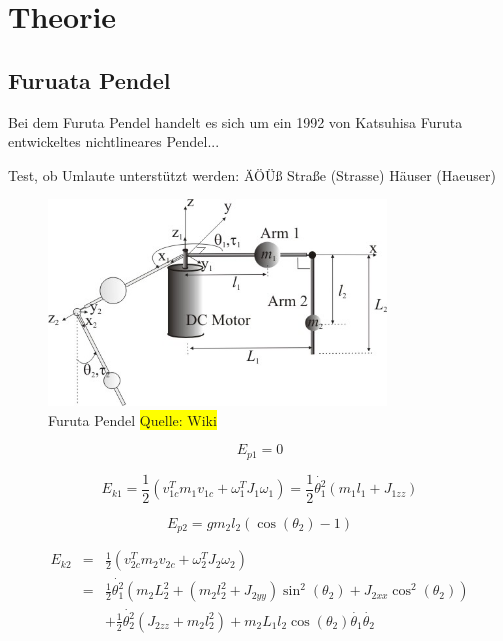\section{Theorie}

\subsection{Furuata Pendel}
Bei dem Furuta Pendel handelt es sich um ein 1992 von Katsuhisa Furuta entwickeltes nichtlineares Pendel...

Test, ob Umlaute unterstützt werden: ÄÖÜß
Straße (Strasse)
Häuser (Haeuser)

\begin{figure}[htbp]
\includegraphics[width=0.8\textwidth]{Grafiken/furuta.jpg}
\caption{Furuta Pendel \colorbox{yellow}{Quelle: Wiki}}
\end{figure}


\begin{equation}
 E_{p1} = 0
\end{equation}

\begin{equation}
E_{k1}=\frac{1}{2}(v^T_{1c}m_1v_{1c}+\omega^T_1J_1\omega_1)=\frac{1}{2}\dot{\theta^2_1}(m_1l_1+J_{1zz})
\end{equation}

\begin{equation}
E_{p2}=gm_2l_2(\cos(\theta_2)-1)
\end{equation}

\begin{eqnarray}
E_{k2}&=&\frac{1}{2}(v^T_{2c}m_2v_{2c}+\omega^T_2J_2\omega_2)\nonumber \\
&=&\frac{1}{2}\dot{\theta^2_1}(m_2L^2_2+(m_2l^2_2+J_{2yy})\sin^2(\theta_2)+J_{2xx}\cos^2(\theta_2))\nonumber \\
&&+\frac{1}{2}\dot{\theta^2_2}(J_{2zz}+m_2l^2_2)+m_2L_1l_2\cos(\theta_2)\dot{\theta_1}\dot{\theta_2}
\end{eqnarray}

